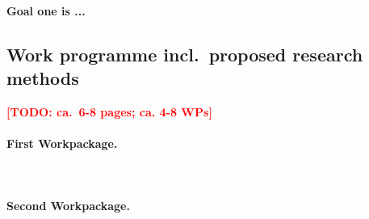 \documentclass{scrartcl}
\newcommand{\todo}[1]{\xspace{\textcolor{red}{\bfseries[TODO: #1]}}\xspace}
\begin{document}
\paragraph{\textnormal{Goal one is ...}}

\subsection{Work programme incl.\ proposed research methods}
\todo{ca.\ 6-8 pages; ca. 4-8 WPs}

\addtocounter{secnumdepth}{1}
\renewcommand{\theparagraph}{WP\arabic{paragraph}}

\vspace*{0.5cm}\hrulefill
\paragraph{First Workpackage.}\mbox{}\\
\hrulefill
\label{wp:1}



\vspace*{0.5cm}\hrulefill
\paragraph{Second Workpackage.}\mbox{}\\
\hrulefill
\label{wp:2}





\let\theparagraph=\oldpara
\end{document}
